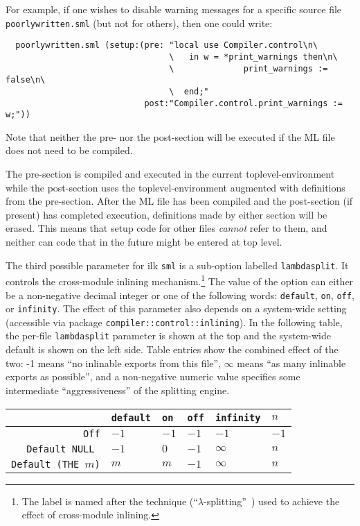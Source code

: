 For example, if one wishes to disable warning messages for a specific
source file {\tt poorlywritten.sml} (but not for others), then one
could write:

\begin{verbatim}
  poorlywritten.sml (setup:(pre: "local use Compiler.control\n\
                                 \   in w = *print_warnings then\n\
                                 \              print_warnings := false\n\
                                 \  end;"
                            post:"Compiler.control.print_warnings := w;"))
\end{verbatim}

\noindent Note that neither the pre- nor the post-section will be
executed if the ML file does not need to be compiled.

The pre-section is compiled and executed in the current
toplevel-environment while the post-section uses the
toplevel-environment augmented with definitions from the pre-section.
After the ML file has been compiled and the post-section (if present)
has completed execution, definitions made by either section will be
erased.  This means that setup code for other files {\em cannot} refer
to them, and neither can code that in the future might be entered at
top level.

The third possible parameter for ilk {\tt sml} is a
sub-option labelled {\tt lambdasplit}.  It controls the cross-module
inlining mechanism.\footnote{The label is named after the
technique (``$\lambda$-splitting''~\cite{blume97:lsplit}) used to
achieve the effect of cross-module inlining.}  The value of the option
can either be a non-negative decimal integer or one of the following
words: {\tt default}, {\tt on}, {\tt off}, or {\tt infinity}.  The
effect of this parameter also depends on a system-wide setting
(accessible via package {\tt compiler::control::inlining}).
In the following table, the per-file {\tt lambdasplit} parameter is
shown at the top and the system-wide default is shown on the left
side.  Table entries show the combined effect of the two: -1
means ``no inlinable exports from this file'', $\infty$ means
``as many inlinable exports as possible'', and a non-negative numeric
value specifies some intermediate ``aggressiveness'' of the splitting
engine.

\begin{center}
\begin{tabular}{r||l|l|l|l|l}
             & {\tt default} & {\tt on} & {\tt off} & {\tt infinity} & $n$ \\
\hline \hline
{\tt Off}    & $-1$          & $-1$     & $-1$      & $-1$           & $-1$ \\
\hline
{\tt Default NULL } & $-1$   & $0$      & $-1$      & $\infty$       & $n$ \\
\hline
{\tt Default (THE $m$)} & $m$ & $m$    & $-1$      & $\infty$       & $n$
\end{tabular}
\end{center}

